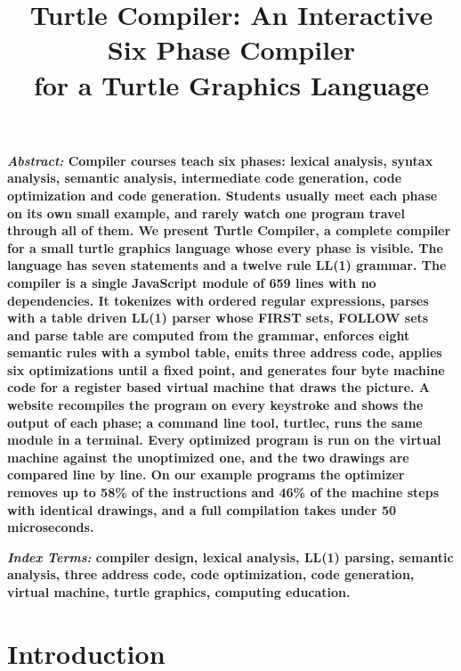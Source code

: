 \documentclass[conference]{IEEEtran}
\begin{document}
\title{Turtle Compiler: An Interactive Six Phase Compiler\\for a Turtle Graphics Language}

\author{
}

\maketitle

{\small\bfseries\noindent\textit{Abstract:} Compiler courses teach six phases: lexical analysis, syntax analysis, semantic analysis, intermediate code generation, code optimization and code generation. Students usually meet each phase on its own small example, and rarely watch one program travel through all of them. We present Turtle Compiler, a complete compiler for a small turtle graphics language whose every phase is visible. The language has seven statements and a twelve rule LL(1) grammar. The compiler is a single JavaScript module of 659 lines with no dependencies. It tokenizes with ordered regular expressions, parses with a table driven LL(1) parser whose FIRST sets, FOLLOW sets and parse table are computed from the grammar, enforces eight semantic rules with a symbol table, emits three address code, applies six optimizations until a fixed point, and generates four byte machine code for a register based virtual machine that draws the picture. A website recompiles the program on every keystroke and shows the output of each phase; a command line tool, turtlec, runs the same module in a terminal. Every optimized program is run on the virtual machine against the unoptimized one, and the two drawings are compared line by line. On our example programs the optimizer removes up to 58\% of the instructions and 46\% of the machine steps with identical drawings, and a full compilation takes under 50 microseconds.\par}

\vspace{0.6em}
{\small\bfseries\noindent\textit{Index Terms:} compiler design, lexical analysis, LL(1) parsing, semantic analysis, three address code, code optimization, code generation, virtual machine, turtle graphics, computing education.\par}

\section{Introduction}
\end{document}
